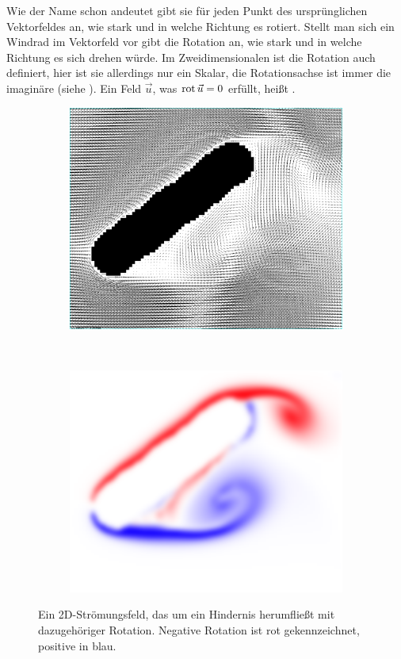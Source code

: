 Wie der Name schon andeutet gibt sie für jeden Punkt des ursprünglichen
Vektorfeldes an, wie stark und in welche Richtung es rotiert. Stellt
man sich ein Windrad im Vektorfeld vor gibt die Rotation an, wie stark und in
welche Richtung es sich drehen würde. Im Zweidimensionalen ist die Rotation auch
definiert, hier ist sie allerdings nur ein Skalar, die Rotationsachse ist immer
die imaginäre  (siehe ). Ein Feld $\vec{u}$, was $\operatorname*{rot}
\vec{u}=0$ erfüllt, heißt .

\begin{figure}
	\begin{subfigure}[b]{0.5\textwidth}
		\centering
		\includegraphics[width=\textwidth]{images/vector_field_rotation_arrows}
		\label{mathematics_image_vectorfield_rotation_arrows}
	\end{subfigure}
	~
	\begin{subfigure}[b]{0.5\textwidth}
		\centering
		\includegraphics[width=\textwidth]{images/vector_field_rotation}
	\end{subfigure}
	\caption{Ein 2D-Strömungsfeld, das um ein Hindernis herumfließt mit dazugehöriger Rotation. Negative Rotation ist rot gekennzeichnet, positive in blau.}
\end{figure}

